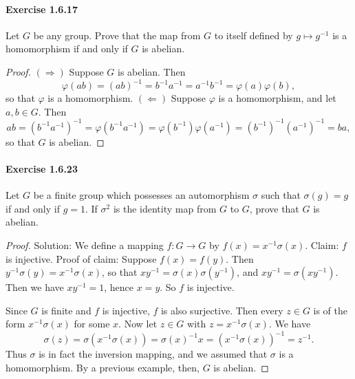 \documentclass{article}
\theoremstyle{definition}
\begin{document}
\paragraph{Exercise 1.6.17} Let $G$ be any group. Prove that the map from $G$ to itself defined by $g \mapsto g^{-1}$ is a homomorphism if and only if $G$ is abelian.
\begin{proof}
    $(\Rightarrow)$ Suppose $G$ is abelian. Then
$$
\varphi(a b)=(a b)^{-1}=b^{-1} a^{-1}=a^{-1} b^{-1}=\varphi(a) \varphi(b),
$$
so that $\varphi$ is a homomorphism.
$(\Leftarrow)$ Suppose $\varphi$ is a homomorphism, and let $a, b \in G$. Then
$$
a b=\left(b^{-1} a^{-1}\right)^{-1}=\varphi\left(b^{-1} a^{-1}\right)=\varphi\left(b^{-1}\right) \varphi\left(a^{-1}\right)=\left(b^{-1}\right)^{-1}\left(a^{-1}\right)^{-1}=b a,
$$
so that $G$ is abelian.
\end{proof}


\paragraph{Exercise 1.6.23} Let $G$ be a finite group which possesses an automorphism $\sigma$ such that $\sigma(g)=g$ if and only if $g=1$. If $\sigma^{2}$ is the identity map from $G$ to $G$, prove that $G$ is abelian.
\begin{proof}
    Solution: We define a mapping $f: G \rightarrow G$ by $f(x)=x^{-1} \sigma(x)$.
Claim: $f$ is injective.
Proof of claim: Suppose $f(x)=f(y)$. Then $y^{-1} \sigma(y)=x^{-1} \sigma(x)$, so that $x y^{-1}=\sigma(x) \sigma\left(y^{-1}\right)$, and $x y^{-1}=\sigma\left(x y^{-1}\right)$. Then we have $x y^{-1}=1$, hence $x=y$. So $f$ is injective.

Since $G$ is finite and $f$ is injective, $f$ is also surjective. Then every $z \in G$ is of the form $x^{-1} \sigma(x)$ for some $x$. Now let $z \in G$ with $z=x^{-1} \sigma(x)$. We have
$$
\sigma(z)=\sigma\left(x^{-1} \sigma(x)\right)=\sigma(x)^{-1} x=\left(x^{-1} \sigma(x)\right)^{-1}=z^{-1} .
$$
Thus $\sigma$ is in fact the inversion mapping, and we assumed that $\sigma$ is a homomorphism. By a previous example, then, $G$ is abelian.
\end{proof}
\end{document}
